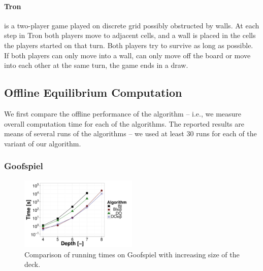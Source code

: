 \paragraph{\textbf{Tron}} is a two-player game played on discrete grid possibly obstructed by walls. At each
step in Tron both players move to adjacent cells, and a wall is placed in the cells the players started on that turn.
Both players try to survive as long as possible. If both players can only move into a wall, can only move off the board or move into each other at the same turn, the game ends  in a draw. 


\subsection{Offline Equilibrium Computation}
We first compare the offline performance of the algorithm -- i.e., we measure overall computation time for each of the algorithms. 
The reported results are means of several runs of the algorithms -- we used at least $30$ runs for each of the variant of our algorithm. 

\subsubsection{Goofspiel}
\begin{figure}
\centering
\includegraphics[width=0.5\textwidth]{figures/GS.pdf}
\caption{Comparison of running times on Goofspiel with increasing size of the deck.} \label{fig:off:res:gs}
\end{figure}

